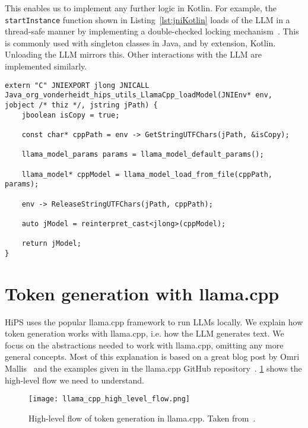 This enables us to implement any further logic in Kotlin. For example, the \lstinline|startInstance| function shown in Listing~\ref{lst:jniKotlin} loads of the \gls{LLM} in a thread-safe manner by implementing a double-checked locking mechanism~\cite{ishizakiTransformingJavaPrograms2014}. This is commonly used with singleton classes in Java, and by extension, Kotlin. Unloading the \gls{LLM} mirrors this. Other interactions with the \gls{LLM} are implemented similarly.

\vspace{0.25cm}

\begin{lstlisting}[caption={[JNI: C++ side]{Example for the C++ side of the \gls{JNI}: Implementation of the function declared \lstinline|external| in Listing~\ref{lst:jniKotlin}.}}, label={lst:jniCpp}]
extern "C" JNIEXPORT jlong JNICALL Java_org_vonderheidt_hips_utils_LlamaCpp_loadModel(JNIEnv* env, jobject /* thiz */, jstring jPath) {
    jboolean isCopy = true;

    const char* cppPath = env -> GetStringUTFChars(jPath, &isCopy);

    llama_model_params params = llama_model_default_params();

    llama_model* cppModel = llama_model_load_from_file(cppPath, params);

    env -> ReleaseStringUTFChars(jPath, cppPath);

    auto jModel = reinterpret_cast<jlong>(cppModel);

    return jModel;
}
\end{lstlisting}

\section{Token generation with llama.cpp}
\label{sec:tokenGenerationWithLlamaCpp}
\gls{HiPS} uses the popular llama.cpp framework to run \glspl{LLM} locally. We explain how token generation works with llama.cpp, i.e. how the \gls{LLM} generates text. We focus on the abstractions needed to work with llama.cpp, omitting any more general concepts. Most of this explanation is based on a great blog post by Omri Mallis~\cite{mallisUnderstandingHowLLM2023} and the examples given in the llama.cpp GitHub repository~\cite{gerganovGgerganovLlamacpp2024}. \cref{fig:llamaCppHighLevelFlow} shows the high-level flow we need to understand.

\begin{figure}
    \begin{wide}
        \captionsetup{width=\linewidth}
        \texttt{[image: llama\_cpp\_high\_level\_flow.png]}
        \caption[llama.cpp: Token generation]{High-level flow of token generation in llama.cpp. Taken from~\cite{mallisUnderstandingHowLLM2023}.}
        \label{fig:llamaCppHighLevelFlow}
    \end{wide}
\end{figure}

